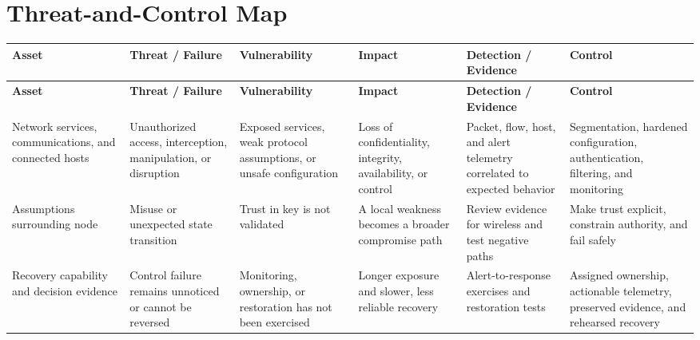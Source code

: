 \documentclass[11pt,letterpaper]{article}
\begin{document}
\section*{Threat-and-Control Map}
\begingroup\scriptsize\setlength{\tabcolsep}{2pt}
\begin{longtable}{>{\raggedright\arraybackslash}p{}>{\raggedright\arraybackslash}p{}>{\raggedright\arraybackslash}p{}>{\raggedright\arraybackslash}p{}>{\raggedright\arraybackslash}p{}>{\raggedright\arraybackslash}p{}}
\toprule\rowcolor{Navy}\color{white}\textbf{Asset} & \color{white}\textbf{Threat / Failure} & \color{white}\textbf{Vulnerability} & \color{white}\textbf{Impact} & \color{white}\textbf{Detection / Evidence} & \color{white}\textbf{Control}\\\midrule
\endfirsthead
\toprule\rowcolor{Navy}\color{white}\textbf{Asset} & \color{white}\textbf{Threat / Failure} & \color{white}\textbf{Vulnerability} & \color{white}\textbf{Impact} & \color{white}\textbf{Detection / Evidence} & \color{white}\textbf{Control}\\\midrule
\endhead
Network services, communications, and connected hosts & Unauthorized access, interception, manipulation, or disruption & Exposed services, weak protocol assumptions, or unsafe configuration & Loss of confidentiality, integrity, availability, or control & Packet, flow, host, and alert telemetry correlated to expected behavior & Segmentation, hardened configuration, authentication, filtering, and monitoring\\\midrule
Assumptions surrounding node & Misuse or unexpected state transition & Trust in key is not validated & A local weakness becomes a broader compromise path & Review evidence for wireless and test negative paths & Make trust explicit, constrain authority, and fail safely\\\midrule
Recovery capability and decision evidence & Control failure remains unnoticed or cannot be reversed & Monitoring, ownership, or restoration has not been exercised & Longer exposure and slower, less reliable recovery & Alert-to-response exercises and restoration tests & Assigned ownership, actionable telemetry, preserved evidence, and rehearsed recovery\\\midrule
\bottomrule
\end{longtable}
\endgroup
\end{document}
